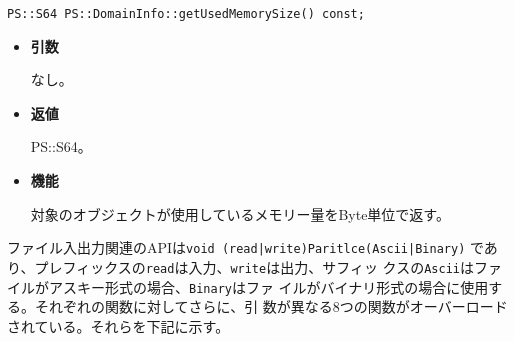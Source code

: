\begin{screen}
\begin{verbatim}
PS::S64 PS::DomainInfo::getUsedMemorySize() const;
\end{verbatim}
\end{screen}

\begin{itemize}

\item {\bf 引数}

なし。

\item {\bf 返値}

PS::S64。

\item {\bf 機能}

対象のオブジェクトが使用しているメモリー量をByte単位で返す。

\end{itemize}


\label{sec:ParticleSystem:IO}

ファイル入出力関連のAPIは{\tt void (read|write)Paritlce(Ascii|Binary)}
  であり、プレフィックスの{\tt read}は入力、{\tt write}は出力、サフィッ
  クスの{\tt Ascii}はファイルがアスキー形式の場合、{\tt Binary}はファ
  イルがバイナリ形式の場合に使用する。それぞれの関数に対してさらに、引
  数が異なる8つの関数がオーバーロードされている。それらを下記に示す。


\label{sec:readParticleAscii}

